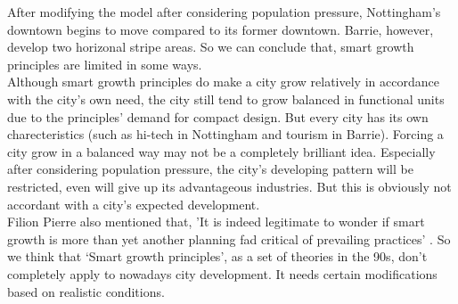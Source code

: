 After modifying the model after considering population pressure, Nottingham's downtown begins to move compared to its former downtown. Barrie, however, develop two horizonal stripe areas. So we can conclude that, smart growth principles are limited in some ways.\\

Although smart growth principles do make a city grow relatively in accordance with the city's own need, the city still tend to grow balanced in functional units due to the principles' demand for compact design.
But every city has its own charecteristics (such as hi-tech in Nottingham and tourism in Barrie). Forcing a city grow in a balanced way may not be a completely brilliant idea.
Especially after considering population pressure, the city's developing pattern will be restricted, even will give up its advantageous industries.
But this is obviously not accordant with a city's expected development.\\

Filion Pierre also mentioned that, 'It is indeed legitimate to wonder if smart growth is more than yet another planning fad critical of prevailing practices' \cite{art:pipan}.
So we think that `Smart growth principles', as a set of theories in the 90s, don't completely apply to nowadays city development. It needs certain modifications based on realistic conditions.


\printbibliography

